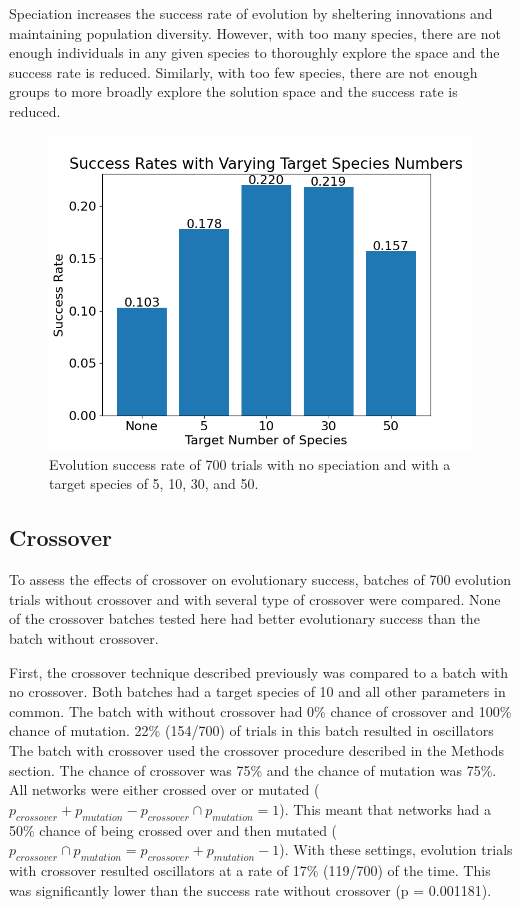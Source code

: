 \documentclass[12pt]{report}
\begin{document}
Speciation increases the success rate of evolution by sheltering innovations and maintaining population diversity. However, with too many species, there are not enough individuals in any given species to thoroughly explore the space and the success rate is reduced. Similarly, with too few species, there are not enough groups to more broadly explore the solution space and the success rate is reduced.

 
\begin{figure}
	\centering
    \includegraphics[width=15cm]{images/species_success_rate.png}
    \caption[Evolutionary success rate with varying target species numbers]{Evolution success rate of 700 trials with no speciation and with a target species of 5, 10, 30, and 50.}
    \label{fig:species_success_rate}
\end{figure}

\subsection{Crossover}
To assess the effects of crossover on evolutionary success, batches of 700 evolution trials without crossover and with several type of crossover were compared. None of the crossover batches tested here had better evolutionary success than the batch without crossover. 

First, the crossover technique described previously was compared to a batch with no crossover. Both batches had a target species of 10 and all other parameters in common. The batch with without crossover had 0\% chance of crossover and 100\% chance of mutation.  22\% (154/700) of trials in this batch resulted in oscillators The batch with crossover used the crossover procedure described in the Methods section. The chance of crossover was 75\% and the chance of mutation was 75\%. All networks were either crossed over or mutated ($p_{crossover} + p_{mutation} - p_{crossover} \cap p_{mutation} = 1$). This meant that networks had a 50\% chance of being crossed over and then mutated ($p_{crossover} \cap p_{mutation} = p_{crossover} + p_{mutation} -1$). With these settings, evolution trials with crossover resulted oscillators at a rate of 17\% (119/700) of the time. This was significantly lower than the success rate without crossover (p = 0.001181).
\end{document}
